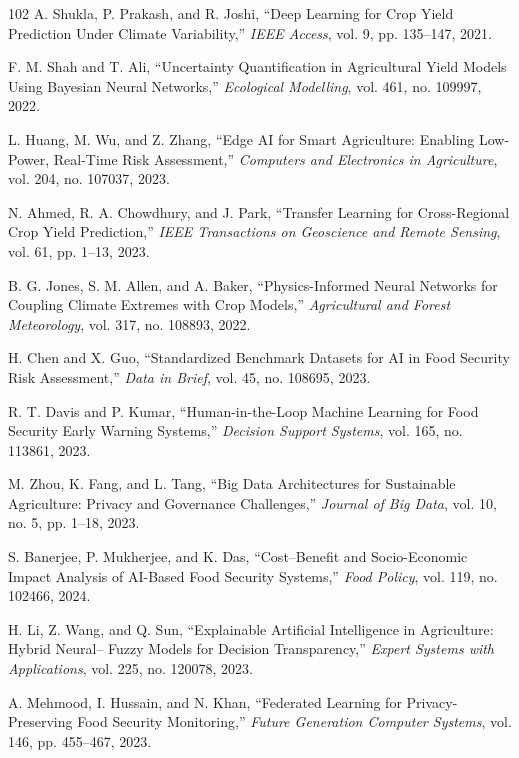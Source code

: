 \documentclass[preprint,12pt]{elsarticle}
\begin{document}
\begin{thebibliography}{102}
		A. Shukla, P. Prakash, and R. Joshi, ``Deep Learning for Crop Yield Prediction Under Climate Variability,'' \emph{IEEE Access}, vol. 9, pp. 135--147, 2021.
		
		F. M. Shah and T. Ali, ``Uncertainty Quantification in Agricultural Yield Models Using Bayesian Neural Networks,'' \emph{Ecological Modelling}, vol. 461, no. 109997, 2022.
		
		L. Huang, M. Wu, and Z. Zhang, ``Edge AI for Smart Agriculture: Enabling Low-Power, Real-Time Risk Assessment,'' \emph{Computers and Electronics in Agriculture}, vol. 204, no. 107037, 2023.
		
		N. Ahmed, R. A. Chowdhury, and J. Park, ``Transfer Learning for Cross-Regional Crop Yield Prediction,'' \emph{IEEE Transactions on Geoscience and Remote Sensing}, vol. 61, pp. 1--13, 2023.
		
		B. G. Jones, S. M. Allen, and A. Baker, ``Physics-Informed Neural Networks for Coupling Climate Extremes with Crop Models,'' \emph{Agricultural and Forest Meteorology}, vol. 317, no. 108893, 2022.
		
		H. Chen and X. Guo, ``Standardized Benchmark Datasets for AI in Food Security Risk Assessment,'' \emph{Data in Brief}, vol. 45, no. 108695, 2023.
		
		R. T. Davis and P. Kumar, ``Human-in-the-Loop Machine Learning for Food Security Early Warning Systems,'' \emph{Decision Support Systems}, vol. 165, no. 113861, 2023.
		
		M. Zhou, K. Fang, and L. Tang, ``Big Data Architectures for Sustainable Agriculture: Privacy and Governance Challenges,'' \emph{Journal of Big Data}, vol. 10, no. 5, pp. 1--18, 2023.
		
		S. Banerjee, P. Mukherjee, and K. Das, ``Cost--Benefit and Socio-Economic Impact Analysis of AI-Based Food Security Systems,'' \emph{Food Policy}, vol. 119, no. 102466, 2024.
		
		H. Li, Z. Wang, and Q. Sun, ``Explainable Artificial Intelligence in Agriculture: Hybrid Neural-- Fuzzy Models for Decision Transparency,'' \emph{Expert Systems with Applications}, vol. 225, no. 120078, 2023.
		
		A. Mehmood, I. Hussain, and N. Khan, ``Federated Learning for Privacy-Preserving Food Security Monitoring,'' \emph{Future Generation Computer Systems}, vol. 146, pp. 455--467, 2023.
		

\end{thebibliography}
\end{document}
